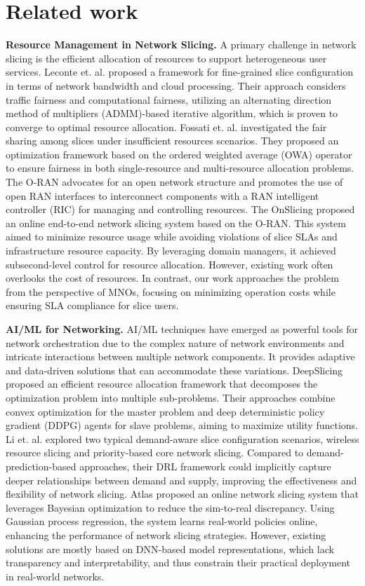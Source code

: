 \section{Related work}
\textbf{Resource Management in Network Slicing.} A primary challenge in network slicing is the efficient allocation of resources to support heterogeneous user services. Leconte et. al. \cite{leconte2018resource} proposed a framework for fine-grained slice configuration in terms of network bandwidth and cloud processing. Their approach considers traffic fairness and computational fairness, utilizing an alternating direction method of multipliers (ADMM)-based iterative algorithm, which is proven to converge to optimal resource allocation. Fossati et. al. \cite{fossati2020multi} investigated the fair sharing among slices under insufficient resources scenarios. They proposed an optimization framework based on the ordered weighted average (OWA) operator to ensure fairness in both single-resource and multi-resource allocation problems. The O-RAN \cite{polese2023understanding} advocates for an open network structure and promotes the use of open RAN interfaces to interconnect components with a RAN intelligent controller (RIC) for managing and controlling resources. The OnSlicing \cite{liu2021onslicing} proposed an online end-to-end network slicing system based on the O-RAN. This system aimed to minimize resource usage while avoiding violations of slice SLAs and infrastructure resource capacity. By leveraging domain managers, it achieved subsecond-level control for resource allocation. However, existing work often overlooks the cost of resources. In contrast, our work approaches the problem from the perspective of MNOs, focusing on minimizing operation costs while ensuring SLA compliance for slice users. 

\textbf{AI/ML for Networking.} AI/ML techniques have emerged as powerful tools for network orchestration due to the complex nature of network environments and intricate interactions between multiple network components. It provides adaptive and data-driven solutions that can accommodate these variations. DeepSlicing \cite{liu2020deepslicing} proposed an efficient resource allocation framework that decomposes the optimization problem into multiple sub-problems. Their approaches combine convex optimization for the master problem and deep deterministic policy gradient (DDPG) agents for slave problems, aiming to maximize utility functions. Li et. al. \cite{li2018deep} explored two typical demand-aware slice configuration scenarios, wireless resource slicing and priority-based core network slicing. Compared to demand-prediction-based approaches, their DRL framework could implicitly capture deeper relationships between demand and supply, improving the effectiveness and flexibility of network slicing. Atlas \cite{liu2022atlas} proposed an online network slicing system that leverages Bayesian optimization to reduce the sim-to-real discrepancy. Using Gaussian process regression, the system learns real-world policies online, enhancing the performance of network slicing strategies. 
However, existing solutions are mostly based on DNN-based model representations, which lack transparency and interpretability, and thus constrain their practical deployment in real-world networks.